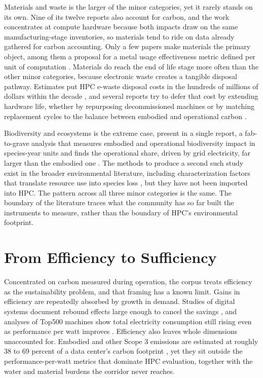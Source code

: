 Materials and waste is the larger of the minor categories, yet it rarely stands on its own. Nine of its twelve reports also account for carbon, and the work concentrates at compute hardware because both impacts draw on the same manufacturing-stage inventories, so materials tend to ride on data already gathered for carbon accounting. Only a few papers make materials the primary object, among them a proposal for a metal usage effectiveness metric defined per unit of computation \parencite{reinbigler2025Metal}. Materials do reach the end of life stage more often than the other minor categories, because electronic waste creates a tangible disposal pathway. Estimates put HPC e-waste disposal costs in the hundreds of millions of dollars within the decade \parencite{zhao2025HighPowered}, and several reports try to defer that cost by extending hardware life, whether by repurposing decommissioned machines \parencite{lynar2010Clustering} or by matching replacement cycles to the balance between embodied and operational carbon \parencite{uwizeyimana2025Carbonaware}.

Biodiversity and ecosystems is the extreme case, present in a single report, a fab-to-grave analysis that measures embodied and operational biodiversity impact in species-year units and finds the operational share, driven by grid electricity, far larger than the embodied one \parencite{shi2025When}. The methods to produce a second such study exist in the broader environmental literature, including characterization factors that translate resource use into species loss \parencite{scherer2023Biodiversity}, but they have not been imported into HPC. The pattern across all three minor categories is the same. The boundary of the literature traces what the community has so far built the instruments to measure, rather than the boundary of HPC's environmental footprint.

\section{From Efficiency to Sufficiency}

Concentrated on carbon measured during operation, the corpus treats efficiency as the sustainability problem, and that framing has a known limit. Gains in efficiency are repeatedly absorbed by growth in demand. Studies of digital systems document rebound effects large enough to cancel the savings \parencite{peng2023Energy}, and analyses of Top500 machines show total electricity consumption still rising even as performance per watt improves \parencite{benhari2024Green, benhari2025Analysis}. Efficiency also leaves whole dimensions unaccounted for. Embodied and other Scope 3 emissions are estimated at roughly 38 to 69 percent of a data center's carbon footprint \parencite{schneiderelectric2023Demystifying}, yet they sit outside the performance-per-watt metrics that dominate HPC evaluation, together with the water and material burdens the corridor never reaches.


